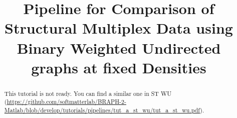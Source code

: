 \documentclass[justified]{tufte-handout}
\title{Pipeline for Comparison of Structural Multiplex Data using Binary Weighted Undirected graphs at fixed Densities}
\begin{document}
\maketitle

\begin{abstract}
\noindent
This tutorial is not ready. You can find a similar one in ST WU (\url{https://github.com/softmatterlab/BRAPH-2-Matlab/blob/develop/tutorials/pipelines/tut_a_st_wu/tut_a_st_wu.pdf}).
\end{abstract}
\end{document}
